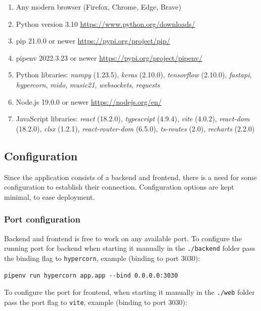 \documentclass{article}
\begin{document}
\begin{enumerate}
    \item Any modern browser (Firefox, Chrome, Edge, Brave)
    \item Python version 3.10 \href{https://www.python.org/downloads/}{https://www.python.org/downloads/}
    \item pip 21.0.0 or newer \href{https://pypi.org/project/pip/}{https://pypi.org/project/pip/}
    \item pipenv 2022.3.23 or newer \href{https://pypi.org/project/pipenv/}{https://pypi.org/project/pipenv/}
    \item Python libraries: \textit{numpy} (1.23.5), \textit{keras} (2.10.0), \textit{tensorflow} (2.10.0), \textit{fastapi}, \textit{hypercorn}, \textit{mido}, \textit{music21}, \textit{websockets}, \textit{requests}

    \item Node.js 19.0.0 or newer \href{https://nodejs.org/en/}{https://nodejs.org/en/}
    \item JavaScript libraries: \textit{react} (18.2.0), \textit{typescript} (4.9.4), \textit{vite} (4.0.2), \textit{react-dom} (18.2.0), \textit{clsx} (1.2.1), \textit{react-router-dom} (6.5.0), \textit{ts-routes} (2.0), \textit{recharts} (2.2.0)
\end{enumerate}

\subsection{Configuration}

Since the application consists of a backend and frontend, there is a need for some configuration to establish their connection. Configuration options are kept minimal, to ease deployment.

\subsubsection{Port configuration}

Backend and frontend is free to work on any available port. To configure the running port for backend when starting it manually in the \verb|./backend| folder pass the binding flag to \verb|hypercorn|, example (binding to port 3030):

\verb|pipenv run hypercorn app.app --bind 0.0.0.0:3030|

To configure the port for frontend, when starting it manually in the \verb|./web| folder pass the port flag to \verb|vite|, example (binding to port 3030):
\end{document}
